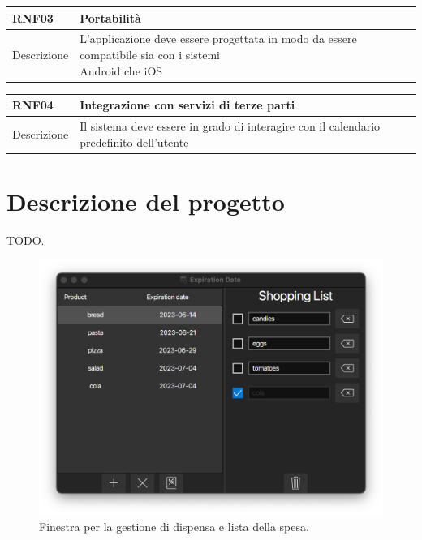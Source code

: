 \documentclass{article}
\begin{document}
\begin{table}[H]
  \begin{flushleft}
    \begin{tabular}{l|l}
      \toprule
      \textbf{RNF03} & \textbf{Portabilità}\\
      \midrule
      Descrizione & \makecell{L'applicazione deve essere progettata in modo da essere compatibile sia con i sistemi \\ Android che iOS}\\
      \bottomrule
    \end{tabular}
  \end{flushleft}
\end{table}

\begin{table}[H]
  \begin{flushleft}
    \begin{tabular}{l|l}
      \toprule
      \textbf{RNF04} & \textbf{Integrazione con servizi di terze parti}\\
      \midrule
      Descrizione & Il sistema deve essere in grado di interagire con il calendario predefinito dell'utente\\
      \bottomrule
    \end{tabular}
  \end{flushleft}
\end{table}

\section{Descrizione del progetto}

TODO.

\begin{figure}[H]
    \includegraphics[width=\linewidth]{images/main-view.png}
    \caption{Finestra per la gestione di dispensa e lista della spesa.}
    \label{fig:mainview}
\end{figure}
\end{document}
